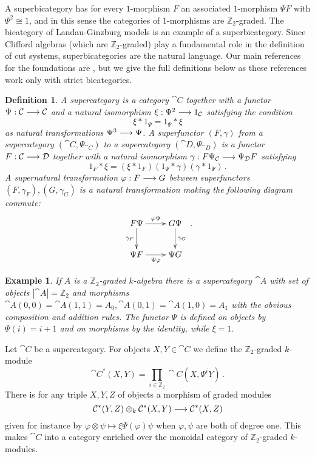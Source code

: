 \documentclass[english,letter paper,12pt,leqno]{article}
\theoremstyle{example}
\newtheorem{definition}[theorem]{Definition}
\newtheorem{example}[theorem]{Example}
\numberwithin{equation}{section}
\begin{document}
A superbicategory has for every $1$-morphism $F$ an associated $1$-morphism $\Psi F$ with $\Psi^2 \cong 1$, and in this sense the categories of $1$-morphisms are $\mathbb{Z}_2$-graded. The bicategory of Landau-Ginzburg models is an example of a superbicategory. Since Clifford algebras (which are $\mathbb{Z}_2$-graded) play a fundamental role in the definition of cut systems, superbicategories are the natural language. Our main references for the foundations are \cite{ellis_lauda,kang,kang2}, but we give the full definitions below as these references work only with strict bicategories.

\begin{definition} A \emph{supercategory} is a category $\cat{C}$ together with a functor $\Psi: \mathcal{C} \longrightarrow \mathcal{C}$ and a natural isomorphism $\xi: \Psi^2 \longrightarrow 1_{\mathcal{C}}$ satisfying the condition
\[
\xi * 1_{\Psi} = 1_{\Psi} * \xi
\]
as natural transformations $\Psi^3 \longrightarrow \Psi$. A \emph{superfunctor} $(F, \gamma)$ from a supercategory $(\cat{C}, \Psi_{\cat{C}})$ to a supercategory $(\cat{D}, \Psi_{\cat{D}})$ is a functor $F: \mathcal{C} \longrightarrow \mathcal{D}$ together with a natural isomorphism $\gamma: F \Psi_{\mathcal{C}} \longrightarrow \Psi_{\mathcal{D}} F$ satisfying
\[
1_F * \xi = (\xi * 1_F ) ( 1_{\Psi} * \gamma ) ( \gamma * 1_{\Psi} )\,.
\]
A \emph{supernatural transformation} $\varphi: F \longrightarrow G$ between superfunctors $(F,\gamma_F), (G,\gamma_G)$ is a natural transformation making the following diagram commute:
\[
\xymatrix{
F \Psi \ar[r]^-{\varphi \Psi}\ar[d]_-{\gamma_F} & G \Psi \ar[d]^-{\gamma_G}\\
\Psi F \ar[r]_-{\Psi \varphi} & \Psi G
}\,.
\] 
\end{definition}

\begin{example}\label{example:Aassup} If $A$ is a $\mathbb{Z}_2$-graded $k$-algebra there is a supercategory $\cat{A}$ with set of objects $|\cat{A}| = \mathbb{Z}_2$ and morphisms $\cat{A}(0,0) = \cat{A}(1,1) = A_0, \cat{A}(0,1) = \cat{A}(1,0) = A_1$ with the obvious composition and addition rules. The functor $\Psi$ is defined on objects by $\Psi(i) = i+1$ and on morphisms by the identity, while $\xi = 1$.
\end{example}

Let $\cat{C}$ be a supercategory. For objects $X,Y \in \cat{C}$ we define the $\mathbb{Z}_2$-graded $k$-module
\[
\cat{C}^*(X,Y) = \prod_{i \in \mathbb{Z}_2} \cat{C}(X, \Psi^i Y)\,.
\]
There is for any triple $X,Y,Z$ of objects a morphism of graded modules
\[
\mathcal{C}^*(Y,Z) \otimes_k \mathcal{C}^*(X, Y) \longrightarrow \mathcal{C}^*(X,Z)
\]
given for instance by $\varphi \otimes \psi \mapsto \xi \Psi( \varphi ) \psi$ when $\varphi, \psi$ are both of degree one. This makes $\cat{C}$ into a category enriched over the monoidal category of $\mathbb{Z}_2$-graded $k$-modules.
\end{document}
